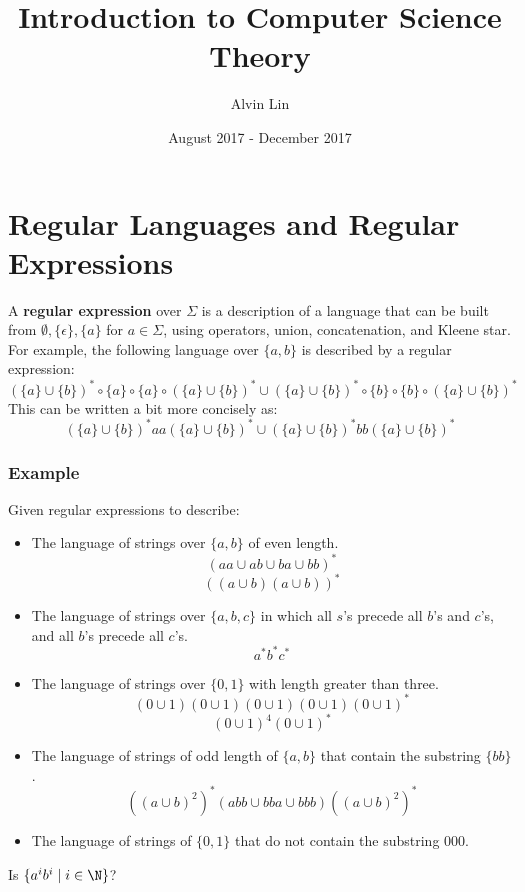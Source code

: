 \documentclass[letterpaper, 12pt]{math}
\title{Introduction to Computer Science Theory}
\author{Alvin Lin}
\date{August 2017 - December 2017}
\begin{document}
\maketitle

\section*{Regular Languages and Regular Expressions}
A \textbf{regular expression} over \( \Sigma \) is a description of a language
that can be built from \( \emptyset,\{\epsilon\},\{a\} \) for \( a\in\Sigma \),
using operators, union, concatenation, and Kleene star. For example, the
following language over \( \{a,b\} \) is described by a regular expression:
\[ (\{a\}\cup\{b\})^*\circ\{a\}\circ\{a\}\circ(\{a\}\cup\{b\})^*\cup
  (\{a\}\cup\{b\})^*\circ\{b\}\circ\{b\}\circ(\{a\}\cup\{b\})^* \]
This can be written a bit more concisely as:
\[ (\{a\}\cup\{b\})^*aa(\{a\}\cup\{b\})^*\cup
  (\{a\}\cup\{b\})^*bb(\{a\}\cup\{b\})^* \]

\subsubsection*{Example}
Given regular expressions to describe:
\begin{itemize}
  \item The language of strings over \( \{a,b\} \) of even length.
  \[ (aa\cup ab\cup ba\cup bb)^* \]
  \[ ((a\cup b)(a\cup b))^* \]
  \item The language of strings over \( \{a,b,c\} \) in which all \( s \)'s
  precede all \( b \)'s and \( c \)'s, and all \( b \)'s precede all \( c \)'s.
  \[ a^*b^*c^* \]
  \item The language of strings over \( \{0,1\} \) with length greater than
  three.
  \[ (0\cup1)(0\cup1)(0\cup1)(0\cup1)(0\cup1)^* \]
  \[ (0\cup1)^4(0\cup1)^* \]
  \item The language of strings of odd length of \( \{a,b\} \) that contain
  the substring \( \{ bb \} \).
  \[ ((a\cup b)^2)^*(abb\cup bba \cup bbb)((a\cup b)^2)^* \]
  \item The language of strings of \( \{0,1\} \) that do not contain the
  substring \( 000 \).
\end{itemize}
Is \( \{a^ib^i \mid i\in\N \} \)?
\end{document}
